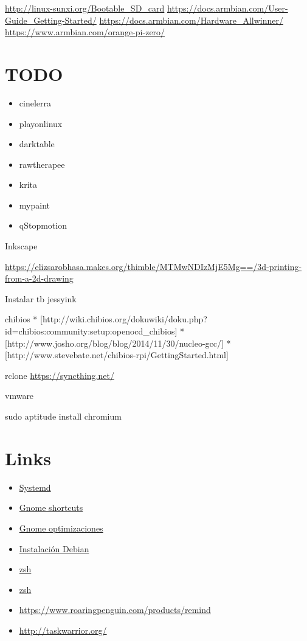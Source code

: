 \documentclass[12pt,spanish,]{article}
\providecommand{\tightlist}{%
  \setlength{\itemsep}{0pt}\setlength{\parskip}{0pt}}
\begin{document}
\url{http://linux-sunxi.org/Bootable_SD_card}
\url{https://docs.armbian.com/User-Guide_Getting-Started/}
\url{https://docs.armbian.com/Hardware_Allwinner/}
\url{https://www.armbian.com/orange-pi-zero/}

\section{TODO}\label{todo-1}

\begin{itemize}
\tightlist
\item
  cinelerra
\item
  playonlinux
\item
  darktable
\item
  rawtherapee
\item
  krita
\item
  mypaint
\item
  qStopmotion
\end{itemize}

Inkscape

\url{https://elizsarobhasa.makes.org/thimble/MTMwNDIzMjE5Mg==/3d-printing-from-a-2d-drawing}

Instalar tb jessyink

chibios *
{[}http://wiki.chibios.org/dokuwiki/doku.php?id=chibios:community:setup:openocd\_chibios{]}
* {[}http://www.josho.org/blog/blog/2014/11/30/nucleo-gcc/{]} *
{[}http://www.stevebate.net/chibios-rpi/GettingStarted.html{]}

rclone \url{https://syncthing.net/}

vmware

sudo aptitude install chromium

\section{Links}\label{links}

\begin{itemize}
\tightlist
\item
  \href{https://wiki.debian.org/systemd}{Systemd}
\item
  \href{https://wiki.gnome.org/Design/OS/KeyboardShortcuts}{Gnome
  shortcuts}
\item
  \href{https://www.linux.com/learn/easy-steps-make-gnome-3-more-efficient}{Gnome
  optimizaciones}
\item
  \href{https://diversidadyunpocodetodo.blogspot.com.es/2015/03/sensores-temperatura-hardware-discos-cpu-debian-ubuntu.html}{Instalación
  Debian}
\item
  \href{http://joshldavis.com/2014/07/26/oh-my-zsh-is-a-disease-antigen-is-the-vaccine/}{zsh}
\item
  \href{http://blog.namangoel.com/zsh-with-antigen}{zsh}
\item
  \url{https://www.roaringpenguin.com/products/remind}
\item
  \url{http://taskwarrior.org/}
\end{itemize}
\end{document}
